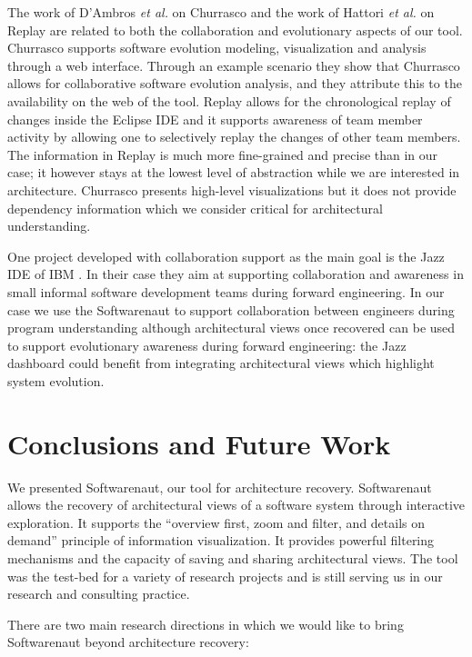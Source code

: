 \documentclass[preprint,12pt]{elsarticle}
\newcommand{\etal}{\emph{et al.}\xspace}
\begin{document}
The work of D'Ambros \etal on Churrasco \cite{dambros-churrasco} and the work of Hattori \etal  on Replay \cite{hattori-replay} are related to both the collaboration and evolutionary aspects of our tool. Churrasco supports software evolution modeling, visualization and analysis through a web interface. Through an example scenario they show that Churrasco allows for collaborative software evolution analysis, and they attribute this to the availability on the web of the tool. Replay allows for the chronological replay of changes inside the Eclipse IDE and it supports awareness of team member activity by allowing one to selectively replay the changes of other team members. The information in Replay is much more fine-grained and precise than in our case; it however stays at the lowest level of abstraction while we are interested in architecture. Churrasco presents high-level visualizations but it does not provide dependency information which we consider critical for architectural understanding. 

One project developed with collaboration support as the main goal is the Jazz IDE of IBM \cite{hupfer-jazz}. 
In their case they aim at supporting collaboration and awareness in small informal software development teams during forward engineering. In our case we use the Softwarenaut to support collaboration between engineers during program understanding although architectural views once recovered can be used to support evolutionary awareness during forward engineering: the Jazz dashboard could benefit from integrating architectural views which highlight system evolution.

\section {Conclusions and Future Work} \label {sec:conc}

We presented Softwarenaut, our tool for architecture recovery. Softwarenaut allows the recovery of architectural views of a software system through interactive exploration. It supports the ``overview first, zoom and filter, and details on demand'' principle of information visualization. It provides powerful filtering mechanisms and the capacity of saving and sharing architectural views. The tool was the test-bed for a variety of research projects and is still serving us in our research and consulting practice. 

There are two main research directions in which we would like to bring Softwarenaut beyond architecture recovery:
\end{document}
